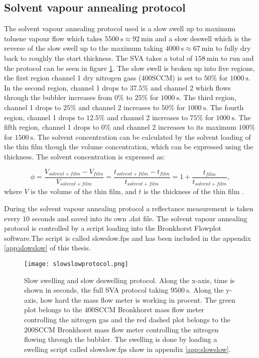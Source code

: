 \documentclass[MasterThesisMain.tex]{subfiles}
\begin{document}
\subsection{Solvent vapour annealing protocol} \label{sec:svaprotocol}
The solvent vapour annealing protocol used is a slow swell up to maximum toluene vapour flow which takes $\SI{5500}{\second}\approx\SI{92}{\minute}$ and a slow deswell which is the reverse of the slow swell up to the maximum taking $\SI{4000}{\second}\approx\SI{67}{\minute}$ to fully dry back to roughly the start thickness. The SVA takes a total of $\SI{158}{\minute}$ to run and the protocol can be seen in figure \ref{fig:slowslow}. The slow swell is broken up into five regions, the first region channel 1 dry nitrogen gass ($400$SCCM) is set to $50 \%$ for $\SI{1000}{\second}$. In the second region, channel 1 drops to $37.5 \%$ and channel 2 which flows through the bubbler increases from $0 \%$ to $25 \%$ for $\SI{1000}{\second}$. The third region, channel 1 drops to $25 \%$ and channel 2 increases to $50 \%$ for $\SI{1000}{\second}$. The fourth region, channel 1 drops to $12.5 \%$ and channel 2 increases to $75 \%$ for $\SI{1000}{\second}$. The fifth region, channel 1 drops to $0 \%$ and channel 2 increases to its maximum $100 \%$ for $\SI{1500}{\second}$. The solvent concentration can be calculated by the solvent loading of the thin film though the volume concentration, which can be expressed using the thickness. The solvent concentration is expressed as:

\begin{equation}\label{eq:solcon}
\phi= \frac{V_{solvent+film}-V_{film}}{V_{solvent+film}} = \frac{t_{solvent+film}-t_{film}}{t_{solvent+film}} = 1+\frac{t_{film}}{t_{solvent+film}}, 
\end{equation}
where $V$ is the volume of the thin film, and $t$ is the thickness of the thin film \cite{solventconcentration}.

During the solvent vapour annealing protocol a reflectance measurement is taken every $10$ seconds and saved into its own .dat file. The solvent vapour annealing protocol is controlled by a script loading into the Bronkhorst Flowplot software.The script is called slowslow.fps and has been included in the appendix \ref{app:slowslow} of this thesis.

\begin{figure}
\centering
\texttt{[image: slowslowprotocol.png]}
\caption{Slow swelling and slow deswelling protocol. Along the x-axis, time is shown in seconds, the full SVA protocol taking $\SI{9500}{\second}$. Along the y-axis, how hard the mass flow meter is working in procent. The green plot belongs to the $400$SCCM Bronkhorst mass flow meter controlling the nitrogen gas and the red dashed plot belongs to the $200$SCCM Bronkhorst mass flow meter controlling the nitrogen flowing through the bubbler. The swelling is done by loading a swelling script called slowslow.fps show in appendix \ref{app:slowslow}.}
\label{fig:slowslow}
\end{figure}
   
\end{document}
